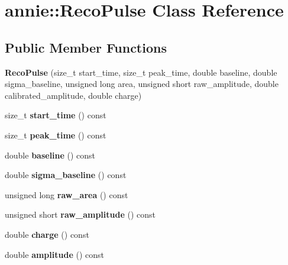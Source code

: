 \hypertarget{classannie_1_1RecoPulse}{
\section{annie::RecoPulse Class Reference}
\label{classannie_1_1RecoPulse}
}
\subsection*{Public Member Functions}
\begin{DoxyCompactItemize}
\item 
\hypertarget{classannie_1_1RecoPulse_af6919399c8fd73cdead617200b636dca}{
{\bfseries RecoPulse} (size\_\-t start\_\-time, size\_\-t peak\_\-time, double baseline, double sigma\_\-baseline, unsigned long area, unsigned short raw\_\-amplitude, double calibrated\_\-amplitude, double charge)}
\label{classannie_1_1RecoPulse_af6919399c8fd73cdead617200b636dca}

\item 
\hypertarget{classannie_1_1RecoPulse_afc6daae53d2755764f5e6c7153e78dc5}{
size\_\-t {\bfseries start\_\-time} () const }
\label{classannie_1_1RecoPulse_afc6daae53d2755764f5e6c7153e78dc5}

\item 
\hypertarget{classannie_1_1RecoPulse_ab95885be21ccb875482754c57e8ee9e0}{
size\_\-t {\bfseries peak\_\-time} () const }
\label{classannie_1_1RecoPulse_ab95885be21ccb875482754c57e8ee9e0}

\item 
\hypertarget{classannie_1_1RecoPulse_a5ba9f0b4bfb1bde8ff4dd099a1c22f24}{
double {\bfseries baseline} () const }
\label{classannie_1_1RecoPulse_a5ba9f0b4bfb1bde8ff4dd099a1c22f24}

\item 
\hypertarget{classannie_1_1RecoPulse_a3ea1063181e0996788aa55490df24ea5}{
double {\bfseries sigma\_\-baseline} () const }
\label{classannie_1_1RecoPulse_a3ea1063181e0996788aa55490df24ea5}

\item 
\hypertarget{classannie_1_1RecoPulse_a0b0097734ca3854c64f3742466a0a512}{
unsigned long {\bfseries raw\_\-area} () const }
\label{classannie_1_1RecoPulse_a0b0097734ca3854c64f3742466a0a512}

\item 
\hypertarget{classannie_1_1RecoPulse_a8968a30e4ebb46514d496a79175258e0}{
unsigned short {\bfseries raw\_\-amplitude} () const }
\label{classannie_1_1RecoPulse_a8968a30e4ebb46514d496a79175258e0}

\item 
\hypertarget{classannie_1_1RecoPulse_ae1ae2094a38f52cc05f0e542a461e27b}{
double {\bfseries charge} () const }
\label{classannie_1_1RecoPulse_ae1ae2094a38f52cc05f0e542a461e27b}

\item 
\hypertarget{classannie_1_1RecoPulse_ac5cff941c570f064d18db3bdf0877714}{
double {\bfseries amplitude} () const }
\label{classannie_1_1RecoPulse_ac5cff941c570f064d18db3bdf0877714}

\end{DoxyCompactItemize}
